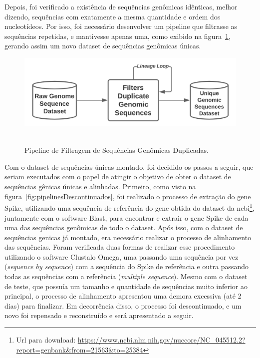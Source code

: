 Depois, foi verificado a existência de sequências genômicas idênticas, melhor dizendo, sequências com exatamente a mesma quantidade e ordem dos nucleotídeos. Por isso, foi necessário desenvolver um pipeline que filtrasse as sequências repetidas, e mantivesse apenas uma, como exibido na figura~\ref{fig:pipelineGenomicasDuplicadas}, gerando assim um novo dataset de sequências genômicas únicas.

\begin{figure}[htb]
  \centering
  \caption{Pipeline de Filtragem de Sequências Genômicas Duplicadas.}
  \includegraphics[scale=0.6]{figuras/pipelines/seqs_genomicas_duplicadas.png}
  ~\label{fig:pipelineGenomicasDuplicadas}
\end{figure}

Com o dataset de sequências únicas montado, foi decidido os passos a seguir, que seriam executados com o papel de atingir o objetivo de obter o dataset de sequências gênicas únicas e alinhadas. Primeiro, como visto na figura~\ref{fig:pipelinesDescontinuados}, foi realizado o processo de extração do gene Spike, utilizando uma sequência de referência do gene obtida do dataset da \gls{ncbi}\footnote{Url para download: \url{https://www.ncbi.nlm.nih.gov/nuccore/NC_045512.2?report=genbank&from=21563&to=25384}}, juntamente com o software Blast, para encontrar e extrair o gene Spike de cada uma das sequências genômicas de todo o dataset. Após isso, com o dataset de sequências genicas já montado, era necessário realizar o processo de alinhamento das sequências. Foram verificada duas formas de realizar esse procedimento utilizando o software Clustalo Omega, uma passando uma sequência por vez (\textit{sequence by sequence}) com a sequência do Spike de referência e outra passando todas as sequências com a referência (\textit{multiple sequence}). Mesmo com o dataset de teste, que possuía um tamanho e quantidade de sequências muito inferior ao principal, o processo de alinhamento apresentou uma demora excessiva (até 2 dias) para finalizar. Em decorrência disso, o processo foi descontinuado, e um novo foi repensado e reconstruído e será apresentado a seguir.

